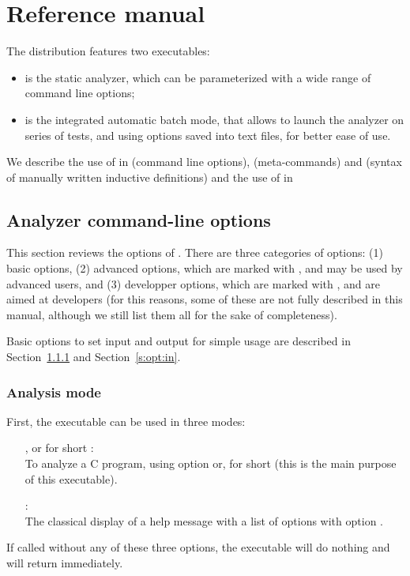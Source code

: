\chapter{Reference manual}
\label{c:3:refman}

The \memcad distribution features two executables:
\begin{itemize}
\item \sanalyze is the static analyzer, which can be parameterized
  with a wide range of command line options;
\item {} is the integrated automatic batch mode, that allows
  to launch the analyzer on series of tests, and using options saved into
  text files, for better ease of use.
\end{itemize}
We describe the use of \sanalyze in  (command line
options),  (\memcad meta-commands) and 
(syntax of manually written inductive definitions) and the use of
 in 

\section{Analyzer command-line options}
\label{s:3:1:analyze}
This section reviews the options of \sanalyze.
There are three categories of options:
(1) basic options,
(2) advanced options, which are marked with \optadv, and may be
used by advanced users, and
(3) developper options, which are marked with \optdev, and are aimed
at \memcad developers (for this reasons, some of these are not fully
described in this manual, although we still list them all for the
sake of completeness).

Basic options to set input and output for simple usage are described
in Section~\ref{s:opt:mode} and Section~\ref{s:opt:in}.

\subsection{Analysis mode}
\label{s:opt:mode}
First, the \sanalyze executable can be used in three modes:
\begin{itemize}
\item[\doption{-analyze}, or for short \doption{-a}]: \\
  To analyze a C program, using option  or, for
  short  (this is the main purpose of this executable).
\item[\doption{-help}]: \\
  The classical display of a help message with a list of options
  with option .
\end{itemize}
If called without any of these three options, the \sanalyze
executable will do nothing and will return immediately.

